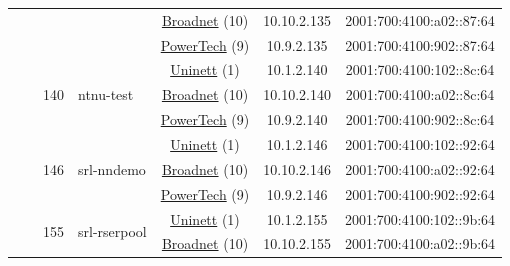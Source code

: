 \begin{small}
\begin{center}
\begin{longtable}{|c|c|c|c|c|c|c|c|}
  &  &  &  & \multicolumn{2}{|c|}{\tiny{\href{https://www.broadnet.no}{Broadnet} (10)}} & \tiny{10.10.2.135} & \tiny{2001:700:4100:a02::87:64} \\* \cline{5-5}\cline{6-6}\cline{7-7}\cline{8-8}
  &  &  &  & \multicolumn{2}{|c|}{\tiny{\href{http://www.powertech.no}{PowerTech} (9)}} & \tiny{10.9.2.135} & \tiny{2001:700:4100:902::87:64} \\* \cline{3-3}\cline{4-4}\cline{5-5}\cline{6-6}\cline{7-7}\cline{8-8}
  &  & \multirow{3}{*}{\tiny{140}} & \multicolumn{1}{|l|}{\multirow{3}{*}{\tiny{ntnu-test}}} & \multicolumn{2}{|c|}{\tiny{\href{https://www.uninett.no}{Uninett} (1)}} & \tiny{10.1.2.140} & \tiny{2001:700:4100:102::8c:64} \\* \cline{5-5}\cline{6-6}\cline{7-7}\cline{8-8}
  &  &  &  & \multicolumn{2}{|c|}{\tiny{\href{https://www.broadnet.no}{Broadnet} (10)}} & \tiny{10.10.2.140} & \tiny{2001:700:4100:a02::8c:64} \\* \cline{5-5}\cline{6-6}\cline{7-7}\cline{8-8}
  &  &  &  & \multicolumn{2}{|c|}{\tiny{\href{http://www.powertech.no}{PowerTech} (9)}} & \tiny{10.9.2.140} & \tiny{2001:700:4100:902::8c:64} \\* \cline{3-3}\cline{4-4}\cline{5-5}\cline{6-6}\cline{7-7}\cline{8-8}
  &  & \multirow{3}{*}{\tiny{146}} & \multicolumn{1}{|l|}{\multirow{3}{*}{\tiny{srl-nndemo}}} & \multicolumn{2}{|c|}{\tiny{\href{https://www.uninett.no}{Uninett} (1)}} & \tiny{10.1.2.146} & \tiny{2001:700:4100:102::92:64} \\* \cline{5-5}\cline{6-6}\cline{7-7}\cline{8-8}
  &  &  &  & \multicolumn{2}{|c|}{\tiny{\href{https://www.broadnet.no}{Broadnet} (10)}} & \tiny{10.10.2.146} & \tiny{2001:700:4100:a02::92:64} \\* \cline{5-5}\cline{6-6}\cline{7-7}\cline{8-8}
  &  &  &  & \multicolumn{2}{|c|}{\tiny{\href{http://www.powertech.no}{PowerTech} (9)}} & \tiny{10.9.2.146} & \tiny{2001:700:4100:902::92:64} \\* \cline{3-3}\cline{4-4}\cline{5-5}\cline{6-6}\cline{7-7}\cline{8-8}
  &  & \multirow{3}{*}{\tiny{155}} & \multicolumn{1}{|l|}{\multirow{3}{*}{\tiny{srl-rserpool}}} & \multicolumn{2}{|c|}{\tiny{\href{https://www.uninett.no}{Uninett} (1)}} & \tiny{10.1.2.155} & \tiny{2001:700:4100:102::9b:64} \\* \cline{5-5}\cline{6-6}\cline{7-7}\cline{8-8}
  &  &  &  & \multicolumn{2}{|c|}{\tiny{\href{https://www.broadnet.no}{Broadnet} (10)}} & \tiny{10.10.2.155} & \tiny{2001:700:4100:a02::9b:64} \\* \cline{5-5}\cline{6-6}\cline{7-7}\cline{8-8}

\end{longtable}
\end{center}
\end{small}
